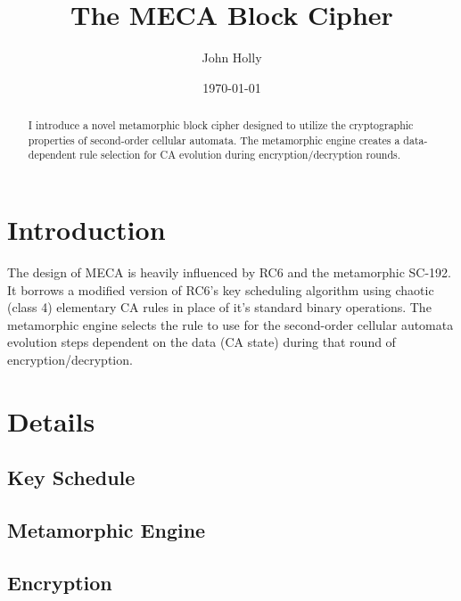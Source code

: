 \documentclass{article}
\title{\textbf{The MECA Block Cipher}}
\author{John Holly}
\date{\today}
\begin{document}
\maketitle

\begin{abstract}
\centering\begin{minipage}{\dimexpr\paperwidth-10cm}
\hspace*{10mm}I introduce a novel metamorphic block cipher designed to utilize the cryptographic properties of second-order cellular automata. The metamorphic engine creates a data-dependent rule selection for CA evolution during encryption/decryption rounds. 
\end{minipage}
\end{abstract}

\bigskip

\section{Introduction}
\hspace*{10mm}%
	The design of MECA is heavily influenced by RC6\cite{RC6} and the metamorphic SC-192\cite{SC-192}. It borrows a modified version of RC6's key scheduling algorithm using chaotic (class 4) elementary CA rules in place of it's standard binary operations. The metamorphic engine selects the rule to use for the second-order cellular automata evolution steps dependent on the data (CA state) during that round of encryption/decryption.

\section{Details}

\subsection{Key Schedule}

\subsection{Metamorphic Engine}

\subsection{Encryption}
\end{document}
